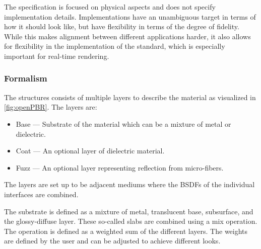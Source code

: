 The specification is focused on physical aspects and does not specify implementation details. Implementations have an unambiguous target in terms of how it should look like, but have flexibility in terms of the degree of fidelity. While this makes alignment between different applications harder, it also allows for flexibility in the implementation of the standard, which is especially important for real-time rendering.

\subsubsection{Formalism}

The structures consists of multiple layers to describe the material as visualized in \autoref{fig:openPBR}. The layers are:

\begin{itemize}
  \item{Base} — Substrate of the material which can be a mixture of metal or dielectric.
  \item{Coat} — An optional layer of dielectric material.
  \item{Fuzz} — An optional layer representing reflection from micro-fibers.
\end{itemize}

The layers are set up to be adjacent mediums where the \glspl{BSDF} of the individual interfaces are combined.

The substrate is defined as a mixture of metal, translucent base, subsurface, and the glossy-diffuse layer. These so-called slabs are combined using a mix operation. The operation is defined as a weighted sum of the different layers. The weights are defined by the user and can be adjusted to achieve different looks.

